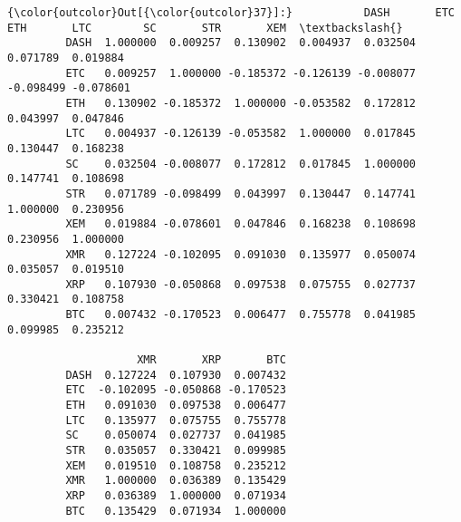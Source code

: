 \documentclass[11pt]{article}
\begin{document}
\begin{Verbatim}[commandchars=\\\{\}]
{\color{outcolor}Out[{\color{outcolor}37}]:}           DASH       ETC       ETH       LTC        SC       STR       XEM  \textbackslash{}
         DASH  1.000000  0.009257  0.130902  0.004937  0.032504  0.071789  0.019884   
         ETC   0.009257  1.000000 -0.185372 -0.126139 -0.008077 -0.098499 -0.078601   
         ETH   0.130902 -0.185372  1.000000 -0.053582  0.172812  0.043997  0.047846   
         LTC   0.004937 -0.126139 -0.053582  1.000000  0.017845  0.130447  0.168238   
         SC    0.032504 -0.008077  0.172812  0.017845  1.000000  0.147741  0.108698   
         STR   0.071789 -0.098499  0.043997  0.130447  0.147741  1.000000  0.230956   
         XEM   0.019884 -0.078601  0.047846  0.168238  0.108698  0.230956  1.000000   
         XMR   0.127224 -0.102095  0.091030  0.135977  0.050074  0.035057  0.019510   
         XRP   0.107930 -0.050868  0.097538  0.075755  0.027737  0.330421  0.108758   
         BTC   0.007432 -0.170523  0.006477  0.755778  0.041985  0.099985  0.235212   
         
                    XMR       XRP       BTC  
         DASH  0.127224  0.107930  0.007432  
         ETC  -0.102095 -0.050868 -0.170523  
         ETH   0.091030  0.097538  0.006477  
         LTC   0.135977  0.075755  0.755778  
         SC    0.050074  0.027737  0.041985  
         STR   0.035057  0.330421  0.099985  
         XEM   0.019510  0.108758  0.235212  
         XMR   1.000000  0.036389  0.135429  
         XRP   0.036389  1.000000  0.071934  
         BTC   0.135429  0.071934  1.000000  
\end{Verbatim}
            
\end{document}
